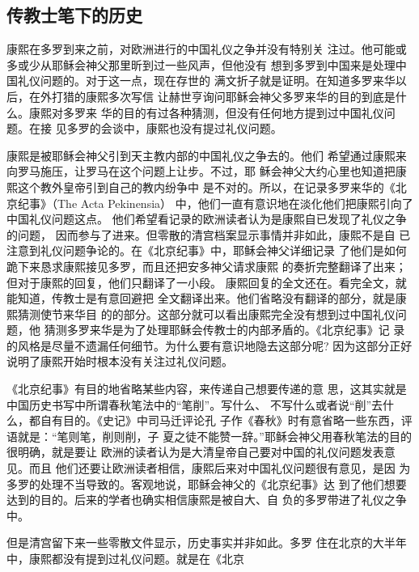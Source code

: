 \subsection{传教士笔下的历史}
\par
康熙在多罗到来之前，对欧洲进行的中国礼仪之争并没有特别关%
注过。他可能或多或少从耶稣会神父那里昕到过一些风声，但他没有%
想到多罗到中国来是处理中国礼仪问题的。对于这一点，现在存世的%
满文折子就是证明。在知道多罗来华以后，在外打猎的康熙多次写信%
让赫世亨询问耶稣会神父多罗来华的目的到底是什么。康熙对多罗来%
华的目的有过各种猜测，但没有任何地方提到过中国礼仪问题。在接%
见多罗的会谈中，康熙也没有提过礼仪问题。%
\par
康熙是被耶稣会神父引到天主教内部的中国礼仪之争去的。他们%
希望通过康熙来向罗马施压，让罗马在这个问题上让步。不过，耶%
稣会神父大约心里也知道把康熙这个教外皇帝引到自己的教内纷争中%
是不对的。所以，在记录多罗来华的《北京纪事》（The Acta Pekinensia）%
中，他们一直有意识地在淡化他们把康熙引向了中国礼仪问题这点。%
他们希望看记录的欧洲读者认为是康熙自已发现了礼仪之争的问题，%
因而参与了进来。但零散的清宫档案显示事情并非如此，康熙不是自%
已注意到礼仪问题争论的。在《北京纪事》中，耶稣会神父详细记录%
了他们是如何跪下来恳求康熙接见多罗，而且还把安多神父请求康熙%
的奏折完整翻译了出来；但对于康熙的回复，他们只翻译了一小段。%
康熙回复的全文还在。看完全文，就能知道，传教士是有意回避把%
全文翻译出来。他们省略没有翻译的部分，就是康熙猜测使节来华目%
的的部分。这部分就可以看出康熙完全没有想到过中国礼仪问题，他%
猜测多罗来华是为了处理耶稣会传教士的内部矛盾的。《北京纪事》记%
录的风格是尽量不遗漏任何细节。为什么要有意识地隐去这部分呢?%
因为这部分正好说明了康熙开始时根本没有关注过礼仪问题。%
\par
《北京纪事》有目的地省略某些内容，来传递自己想要传递的意%
思，这其实就是中国历史书写中所谓春秋笔法中的“笔削”。写什么、%
不写什么或者说“削”去什么，都自有目的。《史记》中司马迁评论孔%
子作《春秋》时有意省略一些东西，评语就是：“笔则笔，削则削，子%
夏之徒不能赞一辞。”耶稣会神父用春秋笔法的目的很明确，就是要让%
欧洲的读者认为是大清皇帝自己要对中国的礼仪问题发表意见。而且%
他们还要让欧洲读者相信，康熙后来对中国礼仪问题很有意见，是因%
为多罗的处理不当导致的。客观地说，耶稣会神父的《北京纪事》达%
到了他们想要达到的目的。后来的学者也确实相信康熙是被自大、自%
负的多罗带进了礼仪之争中。%
\par
但是清宫留下来一些零散文件显示，历史事实并非如此。多罗%
住在北京的大半年中，康熙都没有提到过礼仪问题。就是在《北京%
